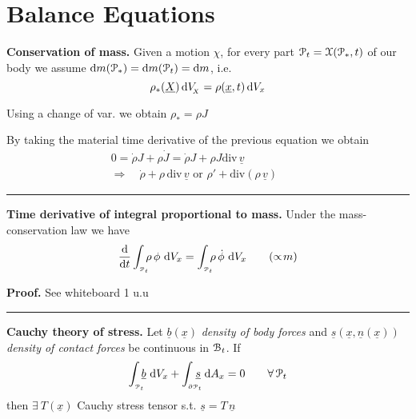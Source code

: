 
\vspace{-0.5em}


\section{\color{red}Balance Equations}


\textbf{Conservation of mass.} Given a motion $\chi$, for every part $\EuScript{P}_t=\EuScript{X}(\EuScript{P}_*,t)$ of our body we assume $\mathrm{d} m(\EuScript{P}_*)=\mathrm{d} m(\EuScript{P}_t)=\mathrm{d} m$, i.e.
\begin{equation*}
\rho_*(\underline{X})\, \mathrm{d} V_{\!_X} = \rho(\underline{x},t)\, \mathrm{d} V_x
\end{equation*}

Using a change of var. we obtain $\boxed{\rho_*=\rho J}$

\smallskip

By taking the material time derivative of the previous equation we obtain
\begin{gather*}
0=\dot{\rho}J+\rho \dot{J}=\dot{\rho}J+\rho J \text{div}\,\underline{v} \\
\Longrightarrow\quad\boxed{\dot{\rho}+\rho\,\text{div}\,\underline{v}}\text{ or }\boxed{\rho'+\text{div}(\rho\, \underline{v})}\qquad\ \ 
\end{gather*}

\rule{0.31\textwidth}{0.2pt}
\smallskip

\textbf{Time derivative of integral proportional to mass.} Under the mass-conservation law we have
\begin{equation*}
\frac{\mathrm{d}}{\mathrm{d} t}\int_{_{\EuScript{P}_t}}\!\!\!  \rho\,\phi\ \mathrm{d} V_{x}=\int_{_{\EuScript{P}_t}}\!\!\!  \rho\,\dot{\phi}\ \mathrm{d} V_{x} \tag{$\propto\!m$}
\end{equation*}

\textbf{\color{lavender(floral)}Proof.} See whiteboard 1 u.u

\vspace{-0.5em}

\rule{0.31\textwidth}{0.2pt}
\smallskip

\textbf{Cauchy theory of stress.} Let $\underline{b}(\underline{x})$ \emph{density of body forces} and $\underline{s}(\underline{x},\underline{n}(\underline{x}))$ \emph{density of contact forces} be continuous in $\EuScript{B}_t$. If
\begin{equation*}
\int_{_{\pt_t}}\!\!\! \underline{b}\ \de V_{x}+\int_{_{\partial \pt_t}}\!\!\!\!\! \underline{s}\ \de A_x=0 \qquad \forall\, \pt_t
\end{equation*}
then $\exists\ T(\underline{x})$ Cauchy stress tensor s.t. $\boxed{\underline{s}=T\, \underline{n}}$

